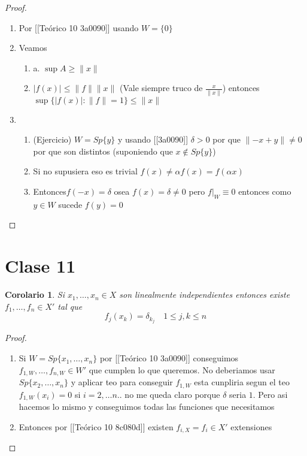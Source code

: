 \documentclass[10pt]{extarticle}
\theoremstyle{break}
\newtheorem{corollary}{Corolario}[theorem]
\theoremstyle{definition}
\begin{document}
\begin{proof}
	\begin{enumerate}[(a.)]
		\item Por [[Teórico 10 3a0090]] usando $W=\{ 0 \}$
		\item Veamos
			\begin{enumerate}
				\item a. $\sup A \geq \lVert x \rVert$
				\item $\lvert f(x) \rvert\leq \lVert f \rVert\lVert x \rVert$ (Vale siempre truco de $\frac{x}{\lVert x \rVert}$) entonces $\sup \{\lvert f(x) \rvert:\lVert f \rVert=1\}\leq \lVert x \rVert$
			\end{enumerate} 
		\item  \begin{enumerate}
				\item (Ejercicio) $W=Sp\{ y \}$ y usando [[3a0090]] $\delta >0$ por que $\lVert -x+y \rVert\neq 0$ por que son distintos (suponiendo que $x \not\in Sp\{ y \}$)
				\item Si no supusiera eso es trivial $f(x)\neq \alpha f(x) = f(\alpha x)$
				\item Entonces$f(-x)=\delta$ osea $f(x)=\delta\neq 0$ pero $f|_{W}\equiv 0$ entonces como $y\in W$ sucede $f(y)=0$\end{enumerate}
	\end{enumerate}

\end{proof}\section{Clase 11}

\begin{corollary}
Si $x_{1},\ldots,x_{n} \in X$ son linealmente independientes entonces existe $f_{1},\ldots,f_{n}\in X'$ tal que $$f_{j}(x_{k})=\delta_{k_{j}} \quad 1\leq j,k\leq n$$
\end{corollary}

\begin{proof}
	\begin{enumerate}
		\item Si $W=Sp\{ x_{1},\ldots,x_{n} \}$ por [[Teórico 10 3a0090]] conseguimos $f_{1,W},\ldots,f_{n,W}\in W'$ que cumplen lo que queremos. No deberiamos usar $Sp\{ x_{2},\ldots,x_{n} \}$ y aplicar teo para conseguir $f_{1,W}$ esta cunpliria segun el teo $f_{1,W}(x_{i})=0$ si $i=2,\ldots n$.. no me queda claro porque $\delta$ seria $1$. Pero asi hacemos lo mismo y conseguimos todas las funciones que necesitamos
		\item Entonces por [[Teórico 10 8c080d]] existen $f_{i,X} = f_{i}\in X'$ extensiones
	\end{enumerate}
\end{proof}
\end{document}
